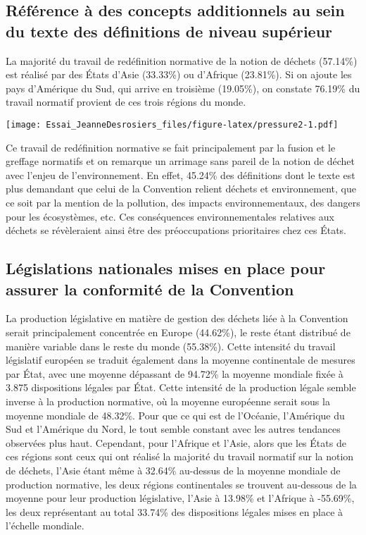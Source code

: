 \documentclass[12pt]{ulaval}
\begin{document}
\subsection{Référence à des concepts additionnels au sein du texte des définitions de niveau supérieur}\label{ruxe9fuxe9rence-uxe0-des-concepts-additionnels-au-sein-du-texte-des-duxe9finitions-de-niveau-supuxe9rieur}

La majorité du travail de redéfinition normative de la notion de déchets (57.14\%) est réalisé par des États d'Asie (33.33\%) ou d'Afrique (23.81\%). Si on ajoute les pays d'Amérique du Sud, qui arrive en troisième (19.05\%), on constate 76.19\% du travail normatif provient de ces trois régions du monde.

\texttt{[image: Essai\_JeanneDesrosiers\_files/figure-latex/pressure2-1.pdf]}

Ce travail de redéfinition normative se fait principalement par la fusion et le greffage normatifs et on remarque un arrimage sans pareil de la notion de déchet avec l'enjeu de l'environnement. En effet, 45.24\% des définitions dont le texte est plus demandant que celui de la Convention relient déchets et environnement, que ce soit par la mention de la pollution, des impacts environnementaux, des dangers pour les écosystèmes, etc. Ces conséquences environnementales relatives aux déchets se révèleraient ainsi être des préoccupations prioritaires chez ces États.

\subsection{Législations nationales mises en place pour assurer la conformité de la Convention}\label{luxe9gislations-nationales-mises-en-place-pour-assurer-la-conformituxe9-de-la-convention}

La production législative en matière de gestion des déchets liée à la Convention serait principalement concentrée en Europe (44.62\%), le reste étant distribué de manière variable dans le reste du monde (55.38\%). Cette intensité du travail législatif européen se traduit également dans la moyenne continentale de mesures par État, avec une moyenne dépassant de 94.72\% la moyenne mondiale fixée à 3.875 dispositions légales par État. Cette intensité de la production légale semble inverse à la production normative, où la moyenne européenne serait sous la moyenne mondiale de 48.32\%. Pour que ce qui est de l'Océanie, l'Amérique du Sud et l'Amérique du Nord, le tout semble constant avec les autres tendances observées plus haut. Cependant, pour l'Afrique et l'Asie, alors que les États de ces régions sont ceux qui ont réalisé la majorité du travail normatif sur la notion de déchets, l'Asie étant même à 32.64\% au-dessus de la moyenne mondiale de production normative, les deux régions continentales se trouvent au-dessous de la moyenne pour leur production législative, l'Asie à 13.98\% et l'Afrique à -55.69\%, les deux représentant au total 33.74\% des dispositions légales mises en place à l'échelle mondiale.
\end{document}
